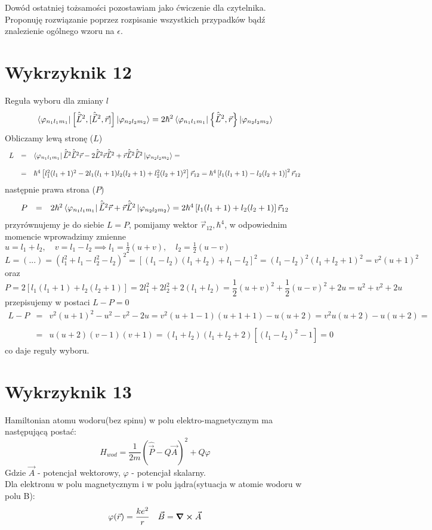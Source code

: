 \documentclass[a4paper,12pt]{article}
\begin{document}
Dowód ostatniej tożsamości pozostawiam jako ćwiczenie dla czytelnika. Proponuję
rozwiązanie poprzez rozpisanie wszystkich przypadków bądź znalezienie ogólnego
wzoru na $\epsilon$.
\section{Wykrzyknik 12}
Reguła wyboru dla zmiany $l$
$$
	\bra{\varphi_{n_1l_1m_1}}\left[\hat{\vec{L}}^2,[\hat{\vec{L}}^2,\vec{r}]\right]\ket{\varphi_{n_2l_2m_2}} = 2\hbar^2\bra{\varphi_{n_1l_1m_1}}\left\{\hat{\vec{L}}^2,\vec{r}\right\} \ket{\varphi_{n_2l_2m_2}}
$$
Obliczamy lewą stronę ($L$)
$$
\begin{array}{lll}
	L &=& \bra{\varphi_{n_1l_1m_1}} \hat{\vec{L}}^2 \hat{\vec{L}}^2\vec{r}- 2\hat{\vec{L}}^2\vec{r}\hat{\vec{L}}^2+\vec{r}\hat{\vec{L}}^2\hat{\vec{L}}^2\ket{\varphi_{n_2l_2m_2}} =\\\\
	&=& \hbar^4\left[l_1^2(l_1+1)^2-2l_1(l_1+1)l_2(l_2+1)+l_2^2(l_2+1)^2 \right]\vec{r}_{12} = \hbar^4\left[l_1(l_1+1)-l_2(l_2+1)\right]^2\vec{r}_{12}
\end{array}
$$
następnie prawa strona ($P$)
$$
\begin{array}{lll}
	P &=& 2\hbar^2\bra{\varphi_{n_1l_1m_1}}\hat{\vec{L}}^2\vec{r}+\vec{r}\hat{\vec{L}}^2\ket{\varphi_{n_2l_2m_2}} = 2\hbar^4\left[l_1(l_1+1)+l_2(l_2+1)\right]\vec{r}_{12}
\end{array}
$$
przyrównujemy je do siebie $L=P$, pomijamy wektor $\vec{r}_{12}, \hbar^4$, w odpowiednim momencie wprowadzimy zmienne $u = l_1+l_2,\quad v = l_1-l_2\implies l_1=\frac{1}{2}(u+v),\quad l_2 = \frac{1}{2}(u-v)$
$$
	L = (...) = (l_1^2+l_1-l_2^2-l_2)^2 = [(l_1-l_2)(l_1+l_2)+l_1-l_2]^2 = (l_1-l_2)^2 (l_1+l_2+1)^2 = v^2 (u+1)^2
$$
oraz
$$
	P = 2[l_1(l_1+1)+l_2(l_2+1)] = 2l_1^2+2l_2^2+2(l_1+l_2) = \frac{1}{2}(u+v)^2+\frac{1}{2}(u-v)^2+2u = u^2+v^2+2u
$$
przepisujemy w postaci $L-P=0$
$$
\begin{array}{lll}
	L-P &=& v^2(u+1)^2-u^2-v^2-2u = v^2(u+1-1)(u+1+1) - u(u+2) = v^2u(u+2)-u(u+2) =\\\\ &=& u(u+2)(v-1)(v+1) = (l_1+l_2)(l_1+l_2+2)[(l_1-l_2)^2-1] = 0
\end{array}
$$
co daje reguły wyboru.

\section{Wykrzyknik 13}
Hamiltonian atomu wodoru(bez spinu) w polu elektro-magnetycznym ma następującą postać:
$$H_{wod} = \frac{1}{2m}(\hat{\vec{P}}-Q\vec{A})^{2} + Q\varphi$$
Gdzie $\vec{A}$ - potencjał wektorowy, $\varphi$ - potencjał skalarny. \\
Dla elektronu w polu magnetycznym i w polu jądra(sytuacja w atomie wodoru w polu B):
\begin{align*}
\varphi(\vec{r}) = \frac{ke^2}{r} && \vec{B} = \curl{\vec{A}}
\end{align*}
\end{document}
